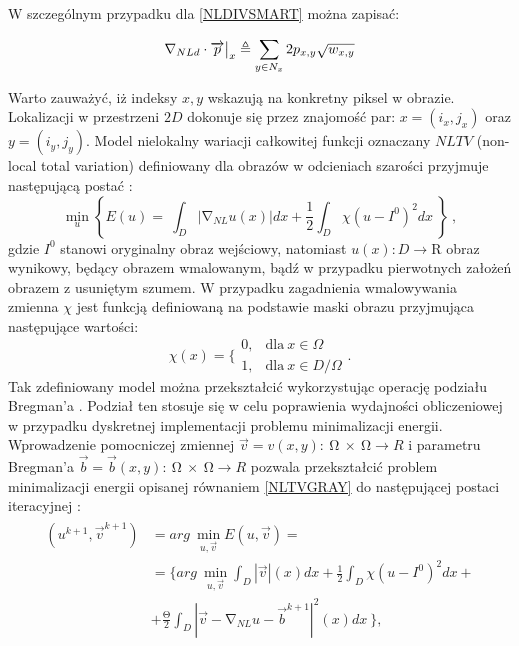 \documentclass[a4paper,12pt,twoside,openany]{report}
\begin{document}
W szczególnym przypadku dla \eqref{NLDIVSMART} można zapisać:
\begin{large}
\begin{equation}
{\mathrm{\nabla }}_{NLd}\cdot \overrightarrow{p}\big|_x \triangleq \sum_{ 
y\in N_x \\ 
}{2p_{x,y}}\sqrt{w_{x,y}}
\label{DNLDIVSMART}
\end{equation}
\end{large}
Warto zauważyć, iż indeksy $x,y$ wskazują na konkretny piksel w obrazie. Lokalizacji w przestrzeni $2D$ dokonuje się przez znajomość par: $x=(i_x,j_x)$ oraz $y=(i_y,j_y)$.
Model nielokalny wariacji całkowitej funkcji oznaczany $NLTV$ (non-local total variation) definiowany dla obrazów w odcieniach szarości przyjmuje następującą postać \cite{rudin1992nonlinear}:
\begin{equation}
{\mathop{\mathrm{min}}_{u} \left\{E\left(u\right)=\ \int_D{\left|{\mathrm{\nabla }}_{NL}u(x)\right|}dx+\frac{1}{2}\int_D{\chi{\left(u-I^0\right)}^2}dx\ \right\}\ }
\label{NLTVGRAY}
,
\end{equation}
gdzie $I^0$ stanowi oryginalny obraz wejściowy, natomiast $u\left(x\right):D\mathrm{\longrightarrow }\mathrm{R}$ obraz wynikowy, będący obrazem wmalowanym, bądź w przypadku pierwotnych założeń obrazem z usuniętym szumem. W przypadku zagadnienia wmalowywania zmienna ${\chi }$ jest funkcją definiowaną na podstawie maski obrazu przyjmująca następujące wartości:
\begin{equation}
\chi \left(x\right)=\Bigg\{ \begin{array}{ll}
0, & \text{dla} \ x \in \Omega \\ 
1, & \text{dla} \ x \in D/ \Omega \end{array}
\label{maskFunction}
.
\end{equation}
Tak zdefiniowany model można przekształcić wykorzystując operację podziału Bregman’a \cite{bresson2009short}. Podział ten stosuje się w celu poprawienia wydajności obliczeniowej w przypadku dyskretnej implementacji problemu minimalizacji energii. Wprowadzenie pomocniczej zmiennej $\overrightarrow{v}=v\left(x,y\right):\ \mathrm{\Omega }\mathrm{\ } \times \ \mathrm{\Omega }\longrightarrow R$ i parametru Bregman’a $\overrightarrow{b}=\overrightarrow{b}\left(x,y\right):\ \mathrm{\Omega }\mathrm{\ }\times \ \mathrm{\Omega }\longrightarrow R$ pozwala przekształcić problem minimalizacji energii opisanej równaniem \eqref{NLTVGRAY} do następującej postaci iteracyjnej \cite{bresson2009short}:
\begin{align}
\begin{aligned}
\left(u^{k+1},{\overrightarrow{v}}^{k+1}\right) &= arg\ \mathop{\mathrm{min}}_{u,\overrightarrow{v}} E\left(u,\overrightarrow{v}\right)=\\ 
&= \biggl\{arg\ \mathop{\mathrm{min}}_{u,\overrightarrow{v}}
\int_D{|\overrightarrow{v}|\left(x\right)}dx+\frac{1}{2}\int_D{{\chi }{\left(u-I^0\right)}^2}dx+\\
&+  \frac{\mathrm{\Theta }}{2}\int_D{{\left|\overrightarrow{v}-{\mathrm{\nabla }}_{NL}u-{\overrightarrow{b}}^{k+1}\right|}^2(x)}dx\ \biggr\},
\end{aligned}
\label{NLTVGRAYMINPROB}
\end{align}
\end{document}
